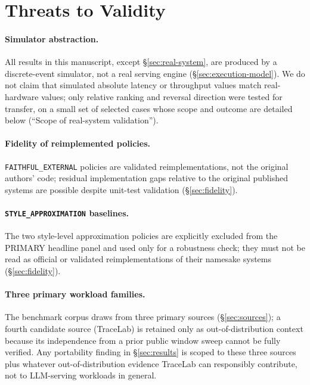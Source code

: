 \section{Threats to Validity}
\label{sec:threats}

\paragraph{Simulator abstraction.} All results in this manuscript, except
\S\ref{sec:real-system}, are produced by a discrete-event simulator, not a
real serving engine (\S\ref{sec:execution-model}). We do not claim that
simulated absolute latency or throughput values match real-hardware
values; only relative ranking and reversal direction were tested for
transfer, on a small set of selected cases whose scope and outcome are
detailed below (``Scope of real-system validation'').

\paragraph{Fidelity of reimplemented policies.} \texttt{FAITHFUL\_EXTERNAL}
policies are validated reimplementations, not the original authors' code;
residual implementation gaps relative to the original published systems
are possible despite unit-test validation (\S\ref{sec:fidelity}).

\paragraph{\texttt{STYLE\_APPROXIMATION} baselines.} The two style-level
approximation policies are explicitly excluded from the PRIMARY headline
panel and used only for a robustness check; they must not be read as
official or validated reimplementations of their namesake systems
(\S\ref{sec:fidelity}).

\paragraph{Three primary workload families.} The benchmark corpus draws from
three primary sources (\S\ref{sec:sources}); a fourth candidate source
(TraceLab) is retained only as out-of-distribution context because its
independence from a prior public window sweep cannot be fully verified.
Any portability finding in \S\ref{sec:results} is scoped to these three
sources plus whatever out-of-distribution evidence TraceLab can
responsibly contribute, not to LLM-serving workloads in general.

